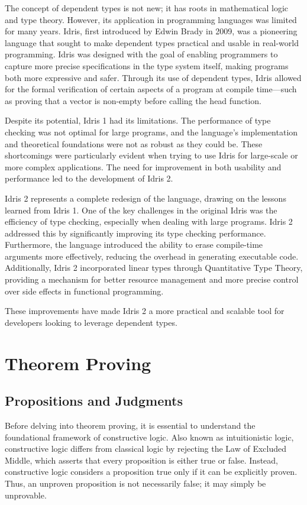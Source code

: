 \documentclass[]{rptuseminar}
\begin{document}
The concept of dependent types is not new; it has roots in mathematical logic and type theory. However, its application in programming languages was limited for many years. Idris, first introduced by Edwin Brady in 2009, was a pioneering language that sought to make dependent types practical and usable in real-world programming. Idris was designed with the goal of enabling programmers to capture more precise specifications in the type system itself, making programs both more expressive and safer. Through its use of dependent types, Idris allowed for the formal verification of certain aspects of a program at compile time—such as proving that a vector is non-empty before calling the head function.

Despite its potential, Idris 1 had its limitations. The performance of type checking was not optimal for large programs, and the language's implementation and theoretical foundations were not as robust as they could be. These shortcomings were particularly evident when trying to use Idris for large-scale or more complex applications. The need for improvement in both usability and performance led to the development of Idris 2.

Idris 2 represents a complete redesign of the language, drawing on the lessons learned from Idris 1. One of the key challenges in the original Idris was the efficiency of type checking, especially when dealing with large programs. Idris 2 addressed this by significantly improving its type checking performance. Furthermore, the language introduced the ability to erase compile-time arguments more effectively, reducing the overhead in generating executable code. Additionally, Idris 2 incorporated linear types through Quantitative Type Theory, providing a mechanism for better resource management and more precise control over side effects in functional programming.

These improvements have made Idris 2 a more practical and scalable tool for developers looking to leverage dependent types.
  

\section{Theorem Proving}
\label{sec:Propositions and judgments}

\subsection{Propositions and Judgments}
Before delving into theorem proving, it is essential to understand the foundational framework of constructive logic. Also known as intuitionistic logic, constructive logic differs from classical logic by rejecting the Law of Excluded Middle, which asserts that every proposition is either true or false. Instead, constructive logic considers a proposition true only if it can be explicitly proven. Thus, an unproven proposition is not necessarily false; it may simply be unprovable.
\end{document}
